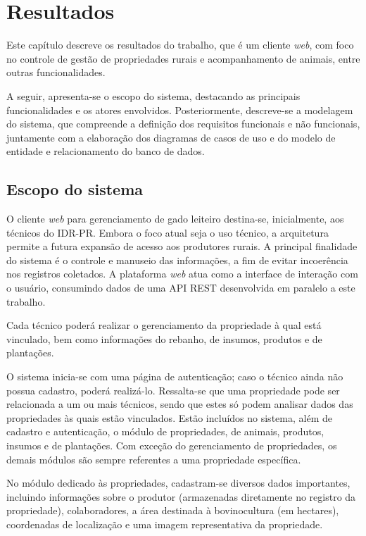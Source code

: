 
\chapter{Resultados}\label{cap:resultados}

Este capítulo descreve os resultados do trabalho, que é um cliente \textit{web}, com foco no controle de gestão de propriedades rurais e acompanhamento de animais, entre outras funcionalidades.

A seguir, apresenta-se o escopo do sistema, destacando as principais funcionalidades e os atores envolvidos. Posteriormente, descreve-se a modelagem do sistema, que compreende a definição dos requisitos funcionais e não funcionais, juntamente com a elaboração dos diagramas de casos de uso e do modelo de entidade e relacionamento do banco de dados.

\section{Escopo do sistema}\label{sec:escopoSistema}

O cliente \textit{web} para gerenciamento de gado leiteiro destina-se, inicialmente, aos técnicos do \gls{IDR-PR}. Embora o foco atual seja o uso técnico, a arquitetura permite a futura expansão de acesso aos produtores rurais. A principal finalidade do sistema é o controle e manuseio das informações, a fim de evitar incoerência nos registros coletados. A plataforma \textit{web} atua como a interface de interação com o usuário, consumindo dados de uma \gls{API} \gls{REST} desenvolvida em paralelo a este trabalho.

Cada técnico poderá realizar o gerenciamento da propriedade à qual está vinculado, bem como informações do rebanho, de insumos, produtos e de plantações.

O sistema inicia-se com uma página de autenticação; caso o técnico ainda não possua cadastro, poderá realizá-lo. Ressalta-se que uma propriedade pode ser relacionada a um ou mais técnicos, sendo que estes só podem analisar dados das propriedades às quais estão vinculados. Estão incluídos no sistema, além de cadastro e autenticação, o módulo de propriedades, de animais, produtos, insumos e de plantações. Com exceção do gerenciamento de propriedades, os demais módulos são sempre referentes a uma propriedade específica.

No módulo dedicado às propriedades, cadastram-se diversos dados importantes, incluindo informações sobre o produtor (armazenadas diretamente no registro da propriedade), colaboradores, a área destinada à bovinocultura (em hectares), coordenadas de localização e uma imagem representativa da propriedade.

